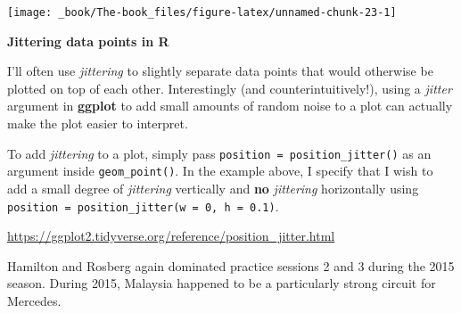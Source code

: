 \documentclass[
]{book}
\begin{document}
\begin{center}\texttt{[image: \_book/The-book\_files/figure-latex/unnamed-chunk-23-1]} \end{center}

\begin{blackbox}

\begin{center}
\textbf{Jittering data points in R}

\end{center}

I'll often use \emph{jittering} to slightly separate data points that would otherwise be plotted on top of each other. Interestingly (and counterintuitively!), using a \emph{jitter} argument in \textbf{ggplot} to add small amounts of random noise to a plot can actually make the plot easier to interpret.

To add \emph{jittering} to a plot, simply pass \texttt{position\ =\ position\_jitter()} as an argument inside \texttt{geom\_point()}. In the example above, I specify that I wish to add a small degree of \emph{jittering} vertically and \textbf{no} \emph{jittering} horizontally using \texttt{position\ =\ position\_jitter(w\ =\ 0,\ h\ =\ 0.1)}.

\url{https://ggplot2.tidyverse.org/reference/position_jitter.html}

\end{blackbox}

Hamilton and Rosberg again dominated practice sessions 2 and 3 during the 2015 season. During 2015, Malaysia happened to be a particularly strong circuit for Mercedes.
\end{document}
